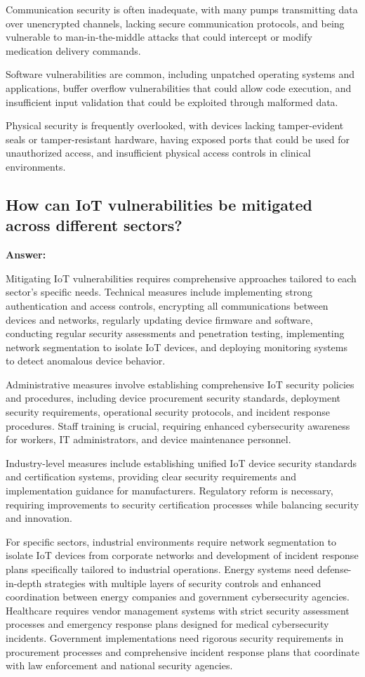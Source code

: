 \documentclass[12pt,a4paper]{article}
\begin{document}
Communication security is often inadequate, with many pumps transmitting data over unencrypted channels, lacking secure communication protocols, and being vulnerable to man-in-the-middle attacks that could intercept or modify medication delivery commands.

Software vulnerabilities are common, including unpatched operating systems and applications, buffer overflow vulnerabilities that could allow code execution, and insufficient input validation that could be exploited through malformed data.

Physical security is frequently overlooked, with devices lacking tamper-evident seals or tamper-resistant hardware, having exposed ports that could be used for unauthorized access, and insufficient physical access controls in clinical environments.

\subsection{How can IoT vulnerabilities be mitigated across different sectors?}

\textbf{Answer:}

Mitigating IoT vulnerabilities requires comprehensive approaches tailored to each sector's specific needs. Technical measures include implementing strong authentication and access controls, encrypting all communications between devices and networks, regularly updating device firmware and software, conducting regular security assessments and penetration testing, implementing network segmentation to isolate IoT devices, and deploying monitoring systems to detect anomalous device behavior.

Administrative measures involve establishing comprehensive IoT security policies and procedures, including device procurement security standards, deployment security requirements, operational security protocols, and incident response procedures. Staff training is crucial, requiring enhanced cybersecurity awareness for workers, IT administrators, and device maintenance personnel.

Industry-level measures include establishing unified IoT device security standards and certification systems, providing clear security requirements and implementation guidance for manufacturers. Regulatory reform is necessary, requiring improvements to security certification processes while balancing security and innovation.

For specific sectors, industrial environments require network segmentation to isolate IoT devices from corporate networks and development of incident response plans specifically tailored to industrial operations. Energy systems need defense-in-depth strategies with multiple layers of security controls and enhanced coordination between energy companies and government cybersecurity agencies. Healthcare requires vendor management systems with strict security assessment processes and emergency response plans designed for medical cybersecurity incidents. Government implementations need rigorous security requirements in procurement processes and comprehensive incident response plans that coordinate with law enforcement and national security agencies.
\end{document}
